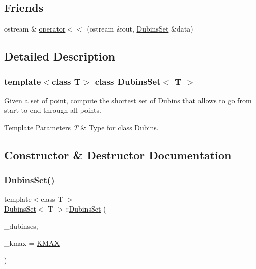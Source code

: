 \subsection*{Friends}
\begin{DoxyCompactItemize}
\item 
ostream \& \mbox{\hyperlink{class_dubins_set_af51d3dfa97a9eb56e9c5d066ed044f4a}{operator$<$$<$}} (ostream \&out, \mbox{\hyperlink{class_dubins_set}{Dubins\+Set}} \&data)
\end{DoxyCompactItemize}


\subsection{Detailed Description}
\subsubsection*{template$<$class T$>$\newline
class Dubins\+Set$<$ T $>$}

Given a set of point, compute the shortest set of \mbox{\hyperlink{class_dubins}{Dubins}} that allows to go from start to end through all points. 


\begin{DoxyTemplParams}{Template Parameters}
{\em T} & Type for class {\ttfamily \mbox{\hyperlink{class_dubins}{Dubins}}}. \\
\hline
\end{DoxyTemplParams}


\subsection{Constructor \& Destructor Documentation}
\mbox{\label{class_dubins_set_a36295af30ddae6a33bb6a8e35aee7eb1}} 
\subsubsection{\texorpdfstring{DubinsSet()}{DubinsSet()}\hspace{0.1cm}{\footnotesize\ttfamily [1/4]}}
{\footnotesize\ttfamily template$<$class T $>$ \\
\mbox{\hyperlink{class_dubins_set}{Dubins\+Set}}$<$ T $>$\+::\mbox{\hyperlink{class_dubins_set}{Dubins\+Set}} (\begin{DoxyParamCaption}\item[{\mbox{\hyperlink{class_tuple}{Tuple}}$<$ \mbox{\hyperlink{class_dubins}{Dubins}}$<$ T $>$ $>$}]{\+\_\+dubinses,  }\item[{double}]{\+\_\+kmax = {\ttfamily \mbox{\hyperlink{dubins_8hh_a940b85a83458e94519f2685b33ddd276}{K\+M\+AX}}} }\end{DoxyParamCaption})\hspace{0.3cm}{\ttfamily [inline]}}

